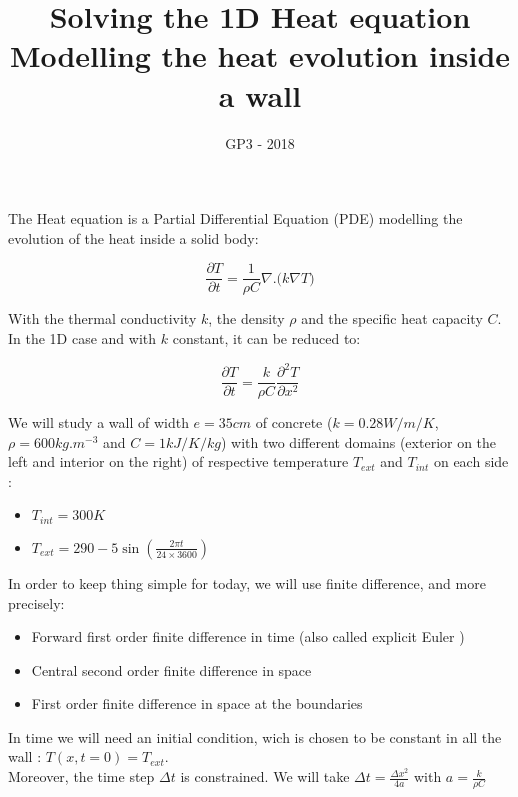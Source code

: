 \documentclass[a4paper,10pt]{article}
\date{GP3 - 2018}
\begin{document}
\title {Solving the 1D Heat equation\\Modelling the heat evolution inside a wall}
\maketitle

The Heat equation is a Partial Differential Equation (PDE) modelling the evolution of the heat inside a solid body:

$$\frac{\partial T}{\partial t}=\frac{1}{\rho C}\nabla.\Big(k\nabla T\Big) $$

With the thermal conductivity $k$, the density $\rho$ and the specific heat capacity $C$.\\
In the 1D case and with $k$ constant, it can be reduced to:

$$\frac{\partial T}{\partial t}=\frac{k}{\rho C}\frac{\partial^2 T}{\partial x^2}$$

We will study a wall of width $e=35cm$ of concrete ($k=0.28W/m/K$, $\rho=600kg.m^{-3}$ and $C=1kJ/K/kg$) with two different domains (exterior on the left and interior on the right) of respective temperature $T_{ext}$ and $T_{int}$ on each side :
\begin{itemize}
\item $T_{int} = 300 K$
\item $T_{ext} =  290 - 5 \sin(\frac{2 \pi t}{24 \times 3600})$\\
\end{itemize}

In order to keep thing simple for today, we will use finite difference, and more precisely:
\begin{itemize}
\item Forward first order finite difference in time (also called explicit Euler )
\item Central second order finite difference in space
\item First order finite difference in space at the boundaries\\
\end{itemize}

In time we will need an initial condition, wich is chosen to be constant in all the wall : $T(x,t=0)=T_{ext}$.\\
Moreover, the time step $\Delta t$ is constrained. We will take $\Delta t=\frac{\Delta x^2}{4a}$ with $a=\frac{k}{\rho C}$\\
\end{document}
